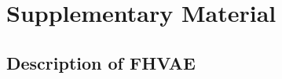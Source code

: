 \documentclass[transmag]{IEEEtran}
\newcommand{\beginsupplement}{%
        \setcounter{table}{0}
        \setcounter{page}{1}
        \setcounter{equation}{0}
        \setcounter{section}{0}
        \renewcommand{\thetable}{S\arabic{table}}%
        \setcounter{figure}{0}
        \renewcommand{\thefigure}{S\arabic{figure}}%
     }
\begin{document}




\clearpage
\renewcommand{\thepage}{S\arabic{page}} 
\renewcommand{\thesection}{S\arabic{section}}  
\renewcommand{\theequation}{S.\arabic{equation}}
\renewcommand{\thetable}{S\arabic{table}}  
\renewcommand{\thefigure}{S\arabic{figure}}

\beginsupplement
\section{Supplementary Material}
\label{sec:supple}
\subsection{Description of FHVAE}
\label{subsec:supple_fhvae_dtails}
\end{document}
